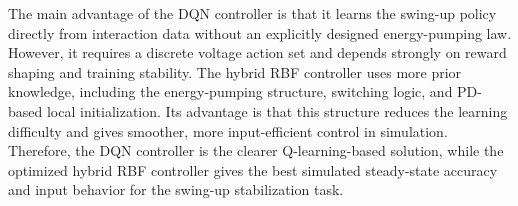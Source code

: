 The main advantage of the DQN controller is that it learns the swing-up policy
directly from interaction data without an explicitly designed energy-pumping
law. However, it requires a discrete voltage action set and depends strongly on
reward shaping and training stability. The hybrid RBF controller uses more
prior knowledge, including the energy-pumping structure, switching logic, and
PD-based local initialization. Its advantage is that this structure reduces the
learning difficulty and gives smoother, more input-efficient control in
simulation. Therefore, the DQN controller is the clearer Q-learning-based
solution, while the optimized hybrid RBF controller gives the best simulated
steady-state accuracy and input behavior for the swing-up stabilization task.
